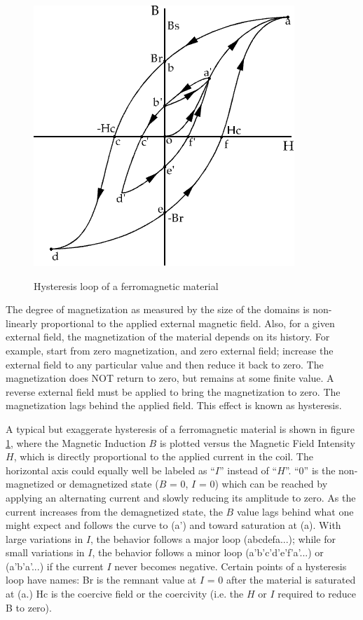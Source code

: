 \documentclass{../lab}
\begin{document}
\begin{figure}[h]
    \centering
    \href{http://experimentationlab.berkeley.edu/sites/default/files/images/BRAimage026.gif}{\includegraphics[width=0.5\linewidth]{images/BRAimage026.png}}
    \caption{Hysteresis loop of a ferromagnetic material}
    \label{fig:BRAimage026}
\end{figure}


The degree of magnetization as measured by the size of the domains is non-linearly proportional to the applied external magnetic field. Also, for a given external field, the magnetization of the material depends on its history. For example, start from zero magnetization, and zero external field; increase the external field to any particular value and then reduce it back to zero. The magnetization does NOT return to zero, but remains at some finite value. A reverse external field must be applied to bring the magnetization to zero. The magnetization lags behind the applied field. This effect is known as hysteresis.

A typical but exaggerate hysteresis of a ferromagnetic material is shown in figure \ref{fig:BRAimage026}, where the Magnetic Induction $B$ is plotted versus the Magnetic Field Intensity $H$, which is directly proportional to the applied current in the coil. The horizontal axis could equally well be labeled as ``$I$'' instead of ``$H$''. ``0'' is the non-magnetized or demagnetized state ($B$ = 0, $I$ = 0) which can be reached by applying an alternating current and slowly reducing its amplitude to zero. As the current increases from the demagnetized state, the $B$ value lags behind what one might expect and follows the curve to (a') and toward saturation at (a). With large variations in $I$, the behavior follows a major loop (abcdefa...); while for small variations in $I$, the behavior follows a minor loop (a'b'c'd'e'f'a'...) or (a'b'a'...) if the current $I$ never becomes negative. Certain points of a hysteresis loop have names: Br is the remnant value at $I$ = 0 after the material is saturated at (a.) Hc is the coercive field or the coercivity (i.e. the $H$ or $I$ required to reduce B to zero).
\end{document}

